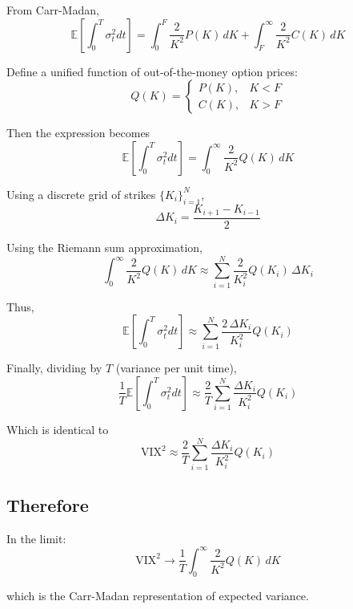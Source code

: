 \documentclass{article}
\begin{document}
From Carr-Madan,
\[
\mathbb{E}\left[\int_0^T \sigma_t^2 dt\right]
=
\int_0^F \frac{2}{K^2} P(K)\, dK
+ \int_F^\infty \frac{2}{K^2} C(K)\, dK
\]

Define a unified function of out-of-the-money option prices:
\[
Q(K) =
\begin{cases}
P(K), & K < F \\
C(K), & K > F
\end{cases}
\]

Then the expression becomes
\[
\mathbb{E}\left[\int_0^T \sigma_t^2 dt\right]
=
\int_0^\infty \frac{2}{K^2} Q(K)\, dK
\]

Using a discrete grid of strikes $\{K_i\}_{i=1}^N$,
\[
\Delta K_i = \frac{K_{i+1} - K_{i-1}}{2}
\]

Using the Riemann sum approximation,
\[
\int_0^\infty \frac{2}{K^2} Q(K)\, dK
\approx
\sum_{i=1}^N \frac{2}{K_i^2} Q(K_i)\, \Delta K_i
\]

Thus,
\[
\mathbb{E}\left[\int_0^T \sigma_t^2 dt\right]
\approx
\sum_{i=1}^N \frac{2\,\Delta K_i}{K_i^2} Q(K_i)
\]

Finally, dividing by $T$ (variance per unit time),
\[
\frac{1}{T}\mathbb{E}\left[\int_0^T \sigma_t^2 dt\right]
\approx
\frac{2}{T} \sum_{i=1}^N \frac{\Delta K_i}{K_i^2} Q(K_i)
\]

Which is identical to
\[
\text{VIX}^2 \approx \frac{2}{T} \sum_{i=1}^N \frac{\Delta K_i}{K_i^2} Q(K_i)
\]

\subsection*{Therefore}
In the limit:
\[
\text{VIX}^2 \to \frac{1}{T}
\int_0^\infty \frac{2}{K^2} Q(K)\, dK
\]

which is the Carr-Madan representation of expected variance.
\end{document}
